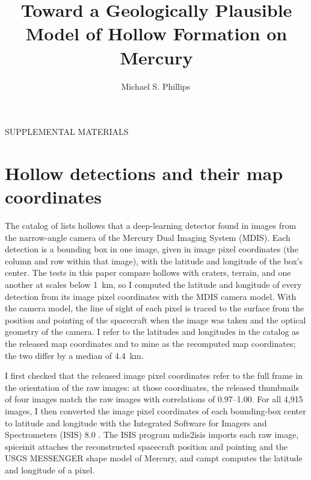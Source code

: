 \documentclass{planetary}
\title{Toward a Geologically Plausible Model of Hollow Formation on Mercury}
\author[1,*]{Michael S. Phillips\,\orcidlink{0000-0001-8873-2238}}
\affil[1]{Lunar and Planetary Laboratory, University of Arizona, Tucson, AZ, USA, https://ror.org/03m2x1q45}
\affil[*]{\textit{Corresponding author:} Michael S. Phillips --- \texttt{phillipsm@arizona.edu}}
\date{}
\begin{document}
\maketitle
\begin{center}
    SUPPLEMENTAL MATERIALS
\end{center}

\thispagestyle{firstpage}

\tableofcontents

\license{}

\newpage


\section{Hollow detections and their map coordinates}
\label{sec:positions}

The catalog of \textcite{bickel2025} lists hollows that a deep-learning detector found in images from the narrow-angle camera of the Mercury Dual Imaging System (MDIS). Each detection is a bounding box in one image, given in image pixel coordinates (the column and row within that image), with the latitude and longitude of the box's center. The tests in this paper compare hollows with craters, terrain, and one another at scales below 1~km, so I computed the latitude and longitude of every detection from its image pixel coordinates with the MDIS camera model. With the camera model, the line of sight of each pixel is traced to the surface from the position and pointing of the spacecraft when the image was taken and the optical geometry of the camera. I refer to the latitudes and longitudes in the catalog as the released map coordinates and to mine as the recomputed map coordinates; the two differ by a median of 4.4~km.

I first checked that the released image pixel coordinates refer to the full frame in the orientation of the raw images: at those coordinates, the released thumbnails of four images match the raw images with correlations of 0.97--1.00. For all 4,915 images, I then converted the image pixel coordinates of each bounding-box center to latitude and longitude with the Integrated Software for Imagers and Spectrometers (ISIS) 8.0 \parencite{isis2023}. The ISIS program mdis2isis imports each raw image, spiceinit attaches the reconstructed spacecraft position and pointing \parencite{spice_messenger} and the USGS MESSENGER shape model of Mercury, and campt computes the latitude and longitude of a pixel.
\end{document}
